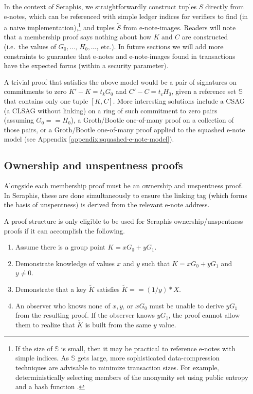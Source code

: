 In the context of Seraphis, we straightforwardly construct tuples $S$ directly from e-notes, which can be referenced with simple ledger indices for verifiers to find (in a naive implementation),\footnote{If the size of $\mathbb{S}$ is small, then it may be practical to reference e-notes with simple indices. As $\mathbb{S}$ gets large, more sophisticated data-compression techniques are advisable to minimize transaction sizes. For example, deterministically selecting members of the anonymity set using public entropy and a hash function \cite{chator-green-how-to-squeeze-crowd}.} and tuples $\tilde{S}$ from e-note-images. Readers will note that a membership proof says nothing about how $K$ and $C$ are constructed (i.e.\ the values of $G_0,...$, $H_0,...$, etc.). In future sections we will add more constraints to guarantee that e-notes and e-note-images found in transactions have the expected forms (within a security parameter).

A trivial proof that satisfies the above model would be a pair of signatures on commitments to zero $K' - K = t_k G_0$ and $C' - C = t_c H_0$, given a reference set $\mathbb{S}$ that contains only one tuple $[K, C]$. More interesting solutions include a CSAG (a CLSAG \cite{clsag-eprint} without linking) on a ring of such commitment to zero pairs (assuming $G_0 == H_0$), a Groth/Bootle one-of-many proof \cite{bootle-one-of-many, triptych-preprint, nwk-paper...} on a collection of those pairs, or a Groth/Bootle one-of-many proof applied to the squashed e-note model (see Appendix \ref{appendix:squashed-e-note-model}).


\subsection{Ownership and unspentness proofs}
\label{subsec:seraphis-ownership-unspentness-proofs}

Alongside each membership proof must be an ownership and unspentness proof. In Seraphis, these are done simultaneously to ensure the linking tag (which forms the basis of unspentness) is derived from the relevant e-note address.

A proof structure is only eligible to be used for Seraphis ownership/unspentness proofs if it can accomplish the following.

\begin{enumerate}
    \item Assume there is a group point $K = x G_0 + y G_1$.

    \item Demonstrate knowledge of values $x$ and $y$ such that $K = x G_0 + y G_1$ and $y \neq 0$.

    \item Demonstrate that a key $\tilde{K}$ satisfies $\tilde{K} == (1/y)*X$.

    \item An observer who knows none of $x, y$, or $x G_0$ must be unable to derive $y G_1$ from the resulting proof. If the observer knows $y G_1$, the proof cannot allow them to realize that $\tilde{K}$ is built from the same $y$ value.
\end{enumerate}

